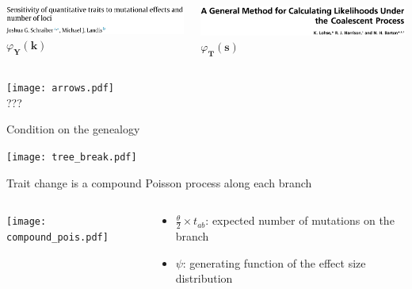 \documentclass{beamer}
\newcommand{\T}{\frac{\theta}{2}}
\begin{document}
\begin{frame}
  \begin{columns}
    \begin{column}{0.5\textwidth}
      \begin{center}
        \includegraphics[width=\columnwidth]{schraiber_title.png}\\
        \vspace{.5cm}
        {\Large $\varphi_{\mathbf{Y}}(\mathbf{k})$}
      \end{center}
    \end{column}
    \begin{column}{0.5\textwidth}
      \begin{center}
        \includegraphics[width=\columnwidth]{lohse_title.png}\\
        \vspace{.5cm}
        {\Large$\varphi_{\mathbf{T}}(\mathbf{s})$}
      \end{center}
    \end{column}
  \end{columns}
  \begin{center}
    \texttt{[image: arrows.pdf]} \\
    {\Large ???}
  \end{center}
\end{frame}

\begin{frame}{Condition on the genealogy}
  \begin{center}
    \texttt{[image: tree\_break.pdf]}
  \end{center}
\end{frame}

\begin{frame}{Trait change is a compound Poisson process along each branch}
  \begin{columns}
    \begin{column}{0.5\textwidth}
      \texttt{[image: compound\_pois.pdf]}
    \end{column}
    \begin{column}{0.5\textwidth}
      \begin{itemize}
      \item $\T \times t_{ab}$: expected number of mutations on the branch
      \item $\psi$: generating function of the effect size distribution
      \end{itemize}
    \end{column}
  \end{columns}
\end{frame}
\end{document}
